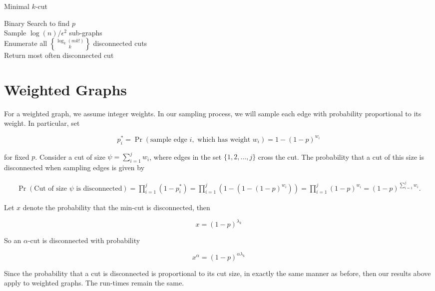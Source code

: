 \documentclass{acm_proc_article-sp}
\DeclareRobustCommand{\stirling}{\genfrac\{\}{0pt}{}}
\begin{document}
\LinesNumbered
\begin{algorithm}
\caption{Minimal $k$-cut}
Binary Search to find $p$ \\
Sample $\log(n)/\epsilon^2$ sub-graphs \\
Enumerate all $\stirling{\log_k(mk!)}{k}$ disconnected cuts \\
Return most often disconnected cut
\end{algorithm}

\section{Weighted Graphs} For a weighted graph, we assume integer weights. In our sampling process, we will sample each edge with probability proportional to its weight. In particular, set

\[
p^*_i = \Pr(\text{sample edge } i, \text{ which has weight } w_i) = 1 - (1-p)^{w_i} 
\]

for fixed $p$. Consider a cut of size $\psi = \sum_{i=1}^j w_i$, where edges in the set $\{1, 2, \ldots, j\}$ cross the cut. The probability that a cut of this size is disconnected when sampling edges is given by

\begin{align*}
\Pr(\text{Cut of size } \psi \text{ is disconnected}) = \prod_{i=1}^j (1 - p_i^*) = \prod_{i=1}^j (1 - (1 - (1-p)^{w_i})) = \prod_{i=1}^j (1-p)^{w_i} = (1-p)^{\sum_{i=1}^j w_i}.
\end{align*}

Let $x$ denote the probability that the min-cut is disconnected, then

\[
x = (1-p)^{\lambda_k}
\]

So an $\alpha$-cut is disconnected with probability

\[
x^\alpha = (1-p)^{\alpha \lambda_k}
\]

Since the probability that a cut is disconnected is proportional to its cut size, in exactly the same manner as before, then our results above apply to weighted graphs. The run-times remain the same.
\end{document}
